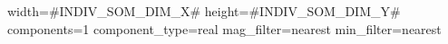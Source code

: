 width=#INDIV_SOM_DIM_X#
height=#INDIV_SOM_DIM_Y#
components=1
component_type=real
mag_filter=nearest
min_filter=nearest
